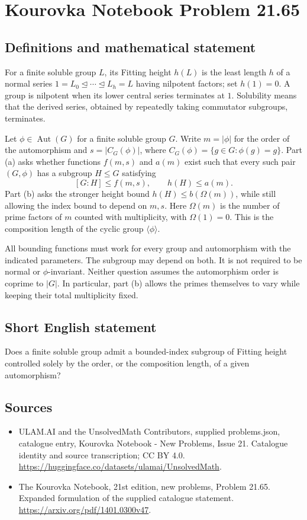 \documentclass[11pt,a4paper]{article}
\begin{document}
\section*{Kourovka Notebook Problem 21.65}\label{statement}

\subsection{Definitions and mathematical statement}
For a finite soluble group $L$, its Fitting height $h(L)$ is the
least length $h$ of a normal series
$1=L_0\trianglelefteq\cdots\trianglelefteq L_h=L$ having nilpotent
factors; set $h(1)=0$. A group is nilpotent when its lower central
series terminates at $1$. Solubility means that the derived series,
obtained by repeatedly taking commutator subgroups, terminates.

Let $\phi\in\operatorname{Aut}(G)$ for a finite soluble group $G$.
Write $m=|\phi|$ for the order of the automorphism and
$s=|C_G(\phi)|$, where
$C_G(\phi)=\{g\in G:\phi(g)=g\}$.
Part (a) asks whether functions $f(m,s)$ and $a(m)$ exist such that
every such pair $(G,\phi)$ has a subgroup $H\le G$ satisfying
\[
 [G:H]\le f(m,s),\qquad h(H)\le a(m).
\]
Part (b) asks the stronger height bound $h(H)\le b(\Omega(m))$,
while still allowing the index bound to depend on $m,s$.
Here $\Omega(m)$ is the number of prime factors of $m$ counted with
multiplicity, with $\Omega(1)=0$. This is the composition length of
the cyclic group $\langle\phi\rangle$.

All bounding functions must work for every group and automorphism
with the indicated parameters. The subgroup may depend on both.
It is not required to be normal or $\phi$-invariant. Neither question
assumes the automorphism order is coprime to $|G|$. In particular,
part (b) allows the primes themselves to vary while keeping their
total multiplicity fixed.
\subsection{Short English statement}
Does a finite soluble group admit a bounded-index subgroup of Fitting height controlled solely by the order, or the composition length, of a given automorphism?
\subsection{Sources}
\begin{itemize}
\item[S1] ULAM.AI and the UnsolvedMath Contributors, supplied problems.json, catalogue entry, Kourovka Notebook - New Problems, Issue 21. Catalogue identity and source transcription; CC BY 4.0.
\url{https://huggingface.co/datasets/ulamai/UnsolvedMath}.
\item[S2] The Kourovka Notebook, 21st edition, new problems, Problem 21.65. Expanded formulation of the supplied catalogue statement.
\url{https://arxiv.org/pdf/1401.0300v47}.
\end{itemize}
\end{document}
